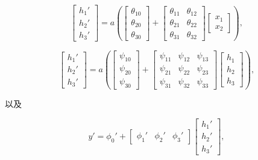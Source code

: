 \begin{equation}
\begin{bmatrix}
	h_1' \\
	h_2' \\
	h_3'
\end{bmatrix}
= a
\left(
\begin{bmatrix}
	\theta_{10} \\
	\theta_{20} \\
	\theta_{30}
\end{bmatrix}
+
\begin{bmatrix}
	\theta_{11} & \theta_{12} \\
	\theta_{21} & \theta_{22} \\
	\theta_{31} & \theta_{32}
\end{bmatrix}
\begin{bmatrix}
	x_1 \\
	x_2
\end{bmatrix}
\right),
\end{equation}

\begin{equation}
\begin{bmatrix}
	h_1' \\
	h_2' \\
	h_3'
\end{bmatrix}
= a
\left(
\begin{bmatrix}
	\psi_{10} \\
	\psi_{20} \\
	\psi_{30}
\end{bmatrix}
+
\begin{bmatrix}
	\psi_{11} & \psi_{12} & \psi_{13} \\
	\psi_{21} & \psi_{22} & \psi_{23} \\
	\psi_{31} & \psi_{32} & \psi_{33}
\end{bmatrix}
\begin{bmatrix}
	h_1 \\
	h_2 \\
	h_3
\end{bmatrix}
\right),
\end{equation}

以及

\begin{equation}
y' = \phi_0' + 
\begin{bmatrix}
	\phi_1' & \phi_2' & \phi_3'
\end{bmatrix}
\begin{bmatrix}
	h_1' \\
	h_2' \\
	h_3' 
\end{bmatrix},
\end{equation}

